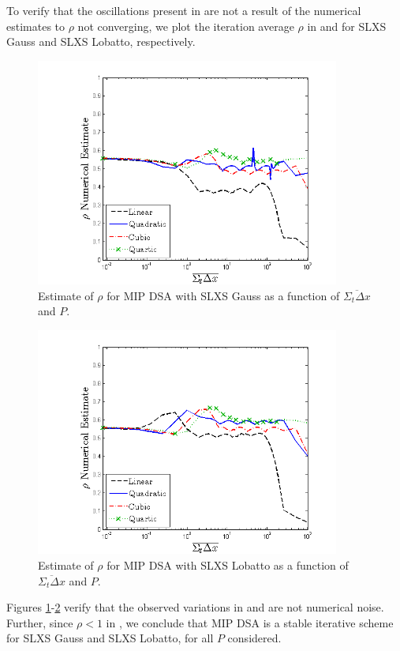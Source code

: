 To verify that the oscillations present in  are not a result of the numerical estimates to $\rho$ not converging, we plot the iteration average $\rho$ in  and  for SLXS Gauss and SLXS Lobatto, respectively.
%
%
%
\begin{figure}[!htp]
\centering
\includegraphics[width=10cm]{chapter4_acceleration/Const_4_Variable_XS_MIP_Gauss.png}
\caption{Estimate of $\rho$ for MIP DSA with SLXS Gauss as a function of $\overline{\Sigma_t \Delta x}$ and $P$.}
\label{fig:varxs_mip_gauss_bar}
\end{figure}
\begin{figure}[!htp]
\centering
\includegraphics[width=10cm]{chapter4_acceleration/Const_4_Variable_XS_MIP_Lobatto.png}
\caption{Estimate of $\rho$ for MIP DSA with SLXS Lobatto as a function of $\overline{\Sigma_t \Delta x}$ and $P$.}
\label{fig:varxs_mip_lobatto_bar}
\end{figure}
Figures \ref{fig:varxs_mip_gauss_bar}-\ref{fig:varxs_mip_lobatto_bar} verify that the observed variations in  and  are not numerical noise.
Further, since $\rho<1$ in , we conclude that MIP DSA is a stable iterative scheme for SLXS Gauss and SLXS Lobatto, for all $P$ considered.

